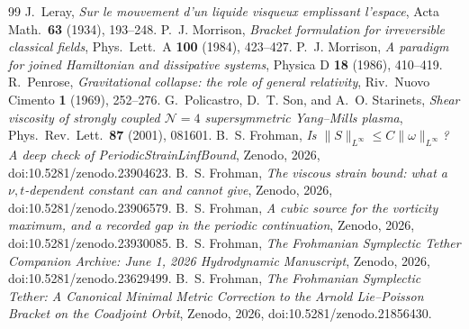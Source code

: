 \documentclass[11pt]{amsart}
\theoremstyle{definition}
\theoremstyle{remark}
\begin{document}
\begin{thebibliography}{99}
 J.~Leray, \emph{Sur le mouvement d'un liquide visqueux emplissant l'espace}, Acta Math.\ \textbf{63} (1934), 193--248.
 P.~J. Morrison, \emph{Bracket formulation for irreversible classical fields}, Phys.\ Lett.\ A \textbf{100} (1984), 423--427.
 P.~J. Morrison, \emph{A paradigm for joined Hamiltonian and dissipative systems}, Physica D \textbf{18} (1986), 410--419.
 R.~Penrose, \emph{Gravitational collapse: the role of general relativity}, Riv.\ Nuovo Cimento \textbf{1} (1969), 252--276.
 G.~Policastro, D.~T. Son, and A.~O. Starinets, \emph{Shear viscosity of strongly coupled $\mathcal{N}=4$ supersymmetric Yang--Mills plasma}, Phys.\ Rev.\ Lett.\ \textbf{87} (2001), 081601.
 B.~S. Frohman, \emph{Is $\|S\|_{L^\infty}\le C\|\omega\|_{L^\infty}$? A deep check of PeriodicStrainLinfBound}, Zenodo, 2026, doi:10.5281/zenodo.23904623.
 B.~S. Frohman, \emph{The viscous strain bound: what a $\nu,t$-dependent constant can and cannot give}, Zenodo, 2026, doi:10.5281/zenodo.23906579.
 B.~S. Frohman, \emph{A cubic source for the vorticity maximum, and a recorded gap in the periodic continuation}, Zenodo, 2026, doi:10.5281/zenodo.23930085.
 B.~S. Frohman, \emph{The Frohmanian Symplectic Tether Companion Archive: June 1, 2026 Hydrodynamic Manuscript}, Zenodo, 2026, doi:10.5281/zenodo.23629499.
 B.~S. Frohman, \emph{The Frohmanian Symplectic Tether: A Canonical Minimal Metric Correction to the Arnold Lie--Poisson Bracket on the Coadjoint Orbit}, Zenodo, 2026, doi:10.5281/zenodo.21856430.
\end{thebibliography}
\end{document}
